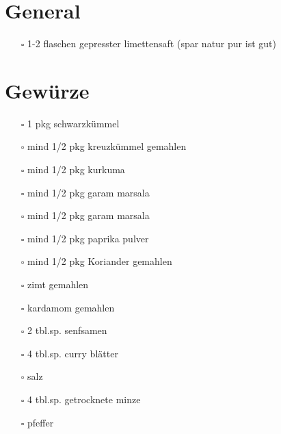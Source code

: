 \documentclass[11pt]{article}
\begin{document}
\section{General}
\label{sec:orgd562c6e}
\begin{itemize}
\item[{$\square$}] 1-2 flaschen gepresster limettensaft (spar natur pur ist gut)
\end{itemize}
\section{Gewürze}
\label{sec:org23a9110}
\begin{itemize}
\item[{$\square$}] 1 pkg schwarzkümmel
\item[{$\square$}] mind 1/2 pkg kreuzkümmel gemahlen
\item[{$\square$}] mind 1/2 pkg  kurkuma
\item[{$\square$}] mind 1/2 pkg  garam marsala
\item[{$\square$}] mind 1/2 pkg  garam marsala
\item[{$\square$}] mind 1/2 pkg  paprika pulver
\item[{$\square$}] mind 1/2 pkg  Koriander gemahlen
\item[{$\square$}] zimt gemahlen
\item[{$\square$}] kardamom gemahlen
\item[{$\square$}] 2 tbl.sp. senfsamen
\item[{$\square$}] 4 tbl.sp. curry blätter
\item[{$\square$}] salz
\item[{$\square$}] 4 tbl.sp. getrocknete minze
\item[{$\square$}] pfeffer
\end{itemize}
\end{document}
